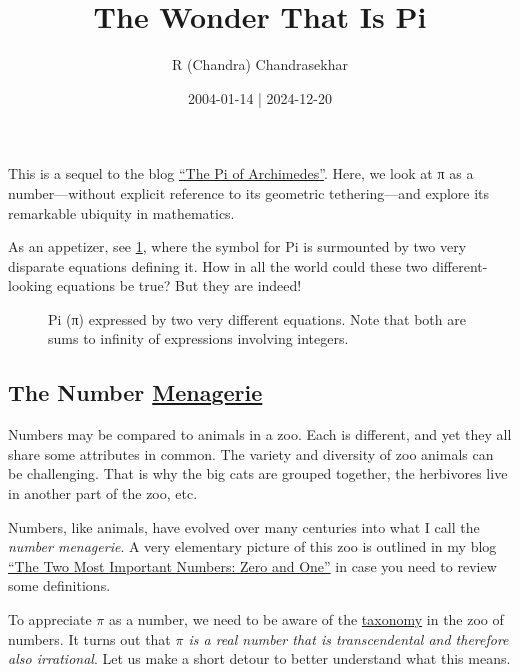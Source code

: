 \documentclass[
  a4paper,
]{article}
\title{The Wonder That Is Pi}
\author{R (Chandra) Chandrasekhar}
\date{2004-01-14 | 2024-12-20}
\begin{document}
\maketitle

\thispagestyle{empty}


This is a sequel to the blog
\href{https://swanlotus.netlify.app/blogs/the-pi-of-archimedes}{``The Pi
of Archimedes''}. Here, we look at π as a number---without explicit
reference to its geometric tethering---and explore its remarkable
ubiquity in mathematics.

As an appetizer, see \cref{fig:pi-equations}, where the symbol for Pi is
surmounted by two very disparate equations defining it. How in all the
world could these two different-looking equations be true? But they are
indeed!

\begin{figure}
\centering

\caption{Pi (π) expressed by two very different equations. Note that
both are sums to infinity of expressions involving
integers.}\label{fig:pi-equations}
\end{figure}

\subsection{\texorpdfstring{The Number
\href{https://www.thefreedictionary.com/menagerie}{Menagerie}}{The Number Menagerie}}\label{the-number-menagerie}

Numbers may be compared to animals in a zoo. Each is different, and yet
they all share some attributes in common. The variety and diversity of
zoo animals can be challenging. That is why the big cats are grouped
together, the herbivores live in another part of the zoo, etc.

Numbers, like animals, have evolved over many centuries into what I call
the \emph{number menagerie}. A very elementary picture of this zoo is
outlined in my blog
\href{https://swanlotus.netlify.app/blogs/the-two-most-important-numbers-zero-and-one}{``The
Two Most Important Numbers: Zero and One''} in case you need to review
some definitions.

To appreciate \(\pi\) as a number, we need to be aware of the
\href{https://www.britannica.com/science/taxonomy}{taxonomy} in the zoo
of numbers. It turns out that \emph{\(\pi\) is a real number that is
transcendental and therefore also irrational}. Let us make a short
detour to better understand what this means.
\end{document}
